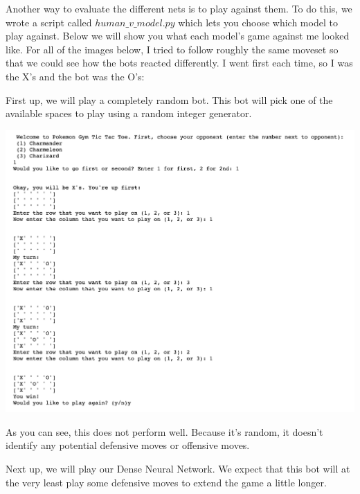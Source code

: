 
	
	


Another way to evaluate the different nets is to play against them. To do this, we wrote a script called $human\_v\_model.py$ which lets you choose which model to play against. Below we will show you what each model's game against me looked like. For all of the images below, I tried to follow roughly the same moveset so that we could see how the bots reacted differently. I went first each time, so I was the X's and the bot was the O's:

First up, we will play a completely random bot. This bot will pick one of the available spaces to play using a random integer generator. 

\includegraphics[scale=.3]{model_1}

As you can see, this does not perform well. Because it's random, it doesn't identify any potential defensive moves or offensive moves.


Next up, we will play our Dense Neural Network. We expect that this bot will at the very least play some defensive moves to extend the game a little longer. 

